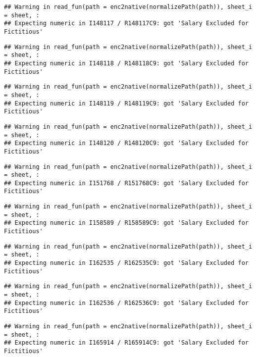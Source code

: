 \documentclass[
]{article}
\begin{document}
\begin{verbatim}
## Warning in read_fun(path = enc2native(normalizePath(path)), sheet_i = sheet, :
## Expecting numeric in I148117 / R148117C9: got 'Salary Excluded for Fictitious'
\end{verbatim}

\begin{verbatim}
## Warning in read_fun(path = enc2native(normalizePath(path)), sheet_i = sheet, :
## Expecting numeric in I148118 / R148118C9: got 'Salary Excluded for Fictitious'
\end{verbatim}

\begin{verbatim}
## Warning in read_fun(path = enc2native(normalizePath(path)), sheet_i = sheet, :
## Expecting numeric in I148119 / R148119C9: got 'Salary Excluded for Fictitious'
\end{verbatim}

\begin{verbatim}
## Warning in read_fun(path = enc2native(normalizePath(path)), sheet_i = sheet, :
## Expecting numeric in I148120 / R148120C9: got 'Salary Excluded for Fictitious'
\end{verbatim}

\begin{verbatim}
## Warning in read_fun(path = enc2native(normalizePath(path)), sheet_i = sheet, :
## Expecting numeric in I151768 / R151768C9: got 'Salary Excluded for Fictitious'
\end{verbatim}

\begin{verbatim}
## Warning in read_fun(path = enc2native(normalizePath(path)), sheet_i = sheet, :
## Expecting numeric in I158589 / R158589C9: got 'Salary Excluded for Fictitious'
\end{verbatim}

\begin{verbatim}
## Warning in read_fun(path = enc2native(normalizePath(path)), sheet_i = sheet, :
## Expecting numeric in I162535 / R162535C9: got 'Salary Excluded for Fictitious'
\end{verbatim}

\begin{verbatim}
## Warning in read_fun(path = enc2native(normalizePath(path)), sheet_i = sheet, :
## Expecting numeric in I162536 / R162536C9: got 'Salary Excluded for Fictitious'
\end{verbatim}

\begin{verbatim}
## Warning in read_fun(path = enc2native(normalizePath(path)), sheet_i = sheet, :
## Expecting numeric in I165914 / R165914C9: got 'Salary Excluded for Fictitious'
\end{verbatim}
\end{document}
